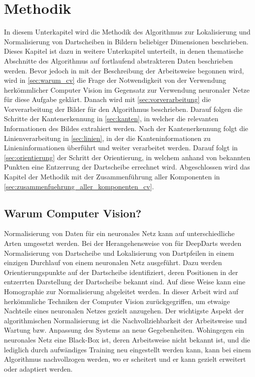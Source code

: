 
\section{Methodik}
\label{sec:cv:methodik}

In diesem Unterkapitel wird die Methodik des Algorithmus zur Lokalisierung und Normalisierung von Dartscheiben in Bildern beliebiger Dimensionen beschrieben. Dieses Kapitel ist dazu in weitere Unterkapitel unterteilt, in denen thematische Abschnitte des Algorithmus auf fortlaufend abstrakteren Daten beschrieben werden. Bevor jedoch in mit der Beschreibung der Arbeitsweise begonnen wird, wird in \autoref{sec:warum_cv} die Frage der Notwendigkeit von der Verwendung herkömmlicher Computer Vision im Gegensatz zur Verwendung neuronaler Netze für diese Aufgabe geklärt. Danach wird mit \autoref{sec:vorverarbeitung} die Vorverarbeitung der Bilder für den Algorithmus beschrieben. Darauf folgen die Schritte der Kantenerkennung in \autoref{sec:kanten}, in welcher die relevanten Informationen des Bildes extrahiert werden. Nach der Kantenerkennung folgt die Linienverarbeitung in \autoref{sec:linien}, in der die Kanteninformationen zu Linieninformationen überführt und weiter verarbeitet werden. Darauf folgt in \autoref{sec:orientierung} der Schritt der Orientierung, in welchem anhand von bekannten Punkten eine Entzerrung der Dartscheibe errechnet wird. Abgeschlossen wird das Kapitel der Methodik mit der Zusammenführung aller Komponenten in \autoref{sec:zusammenfuehrung_aller_komponenten_cv}.


\subsection{Warum Computer Vision?}
\label{sec:warum_cv}

Normalisierung von Daten für ein neuronales Netz kann auf unterschiedliche Arten umgesetzt werden. Bei der Herangehensweise von \citeauthor{deepdarts} für DeepDarts werden Normalisierung von Dartscheibe und Lokalisierung von Dartpfeilen in einem einzigen Durchlauf von einem neuronalen Netz ausgeführt. Dazu werden Orientierungspunkte auf der Dartscheibe identifiziert, deren Positionen in der entzerrten Darstellung der Dartscheibe bekannt sind. Auf diese Weise kann eine Homographie zur Normalisierung abgeleitet werden. In dieser Arbeit wird auf herkömmliche Techniken der Computer Vision zurückgegriffen, um etwaige Nachteile eines neuronalen Netzes gezielt anzugehen. Der wichtigste Aspekt der algorithmischen Normalisierung ist die Nachvollziehbarkeit der Arbeitsweise und Wartung bzw. Anpassung des Systems an neue Gegebenheiten. Wohingegen ein neuronales Netz eine Black-Box ist, deren Arbeitsweise nicht bekannt ist, und die lediglich durch aufwändiges Training neu eingestellt werden kann, kann bei einem Algorithmus nachvollzogen werden, wo er scheitert und er kann gezielt erweitert oder adaptiert werden.

